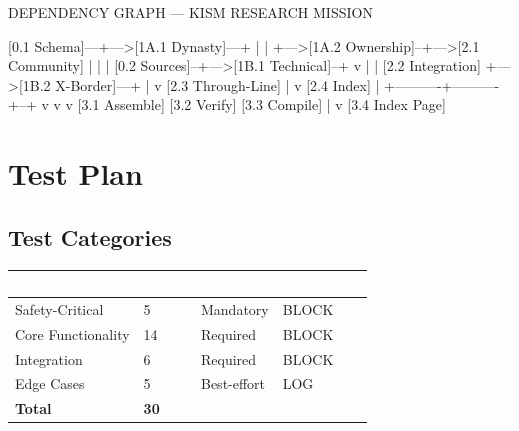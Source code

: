 \documentclass[11pt,letterpaper]{article}
\newcommand{\tableheader}[1]{\textbf{\sffamily\textcolor{white}{#1}}}
\begin{document}
\begin{asciibox}
DEPENDENCY GRAPH --- KISM RESEARCH MISSION

  [0.1 Schema]---+--->[1A.1 Dynasty]---+
                 |                      |
                 +--->[1A.2 Ownership]--+--->[2.1 Community]
                 |                      |         |
  [0.2 Sources]--+--->[1B.1 Technical]--+         v
                 |                      |   [2.2 Integration]
                 +--->[1B.2 X-Border]---+         |
                                                  v
                                          [2.3 Through-Line]
                                                  |
                                                  v
                                          [2.4 Index]
                                                  |
                         +----------+----------+--+
                         v          v          v
                    [3.1 Assemble] [3.2 Verify] [3.3 Compile]
                                                  |
                                                  v
                                          [3.4 Index Page]
\end{asciibox}

\section{Test Plan}

\subsection{Test Categories}

\begin{center}
\begin{tabularx}{\textwidth}{L{3cm}C{1.5cm}C{2cm}C{2cm}}
\toprule
{}
\tableheader{Category} & \tableheader{Count} & \tableheader{Priority} & \tableheader{Fail Action} \\
\midrule
Safety-Critical & 5 & Mandatory & BLOCK \\
Core Functionality & 14 & Required & BLOCK \\
Integration & 6 & Required & BLOCK \\
Edge Cases & 5 & Best-effort & LOG \\
\midrule
\textbf{Total} & \textbf{30} & & \\
\bottomrule
\end{tabularx}
\end{center}
\end{document}
